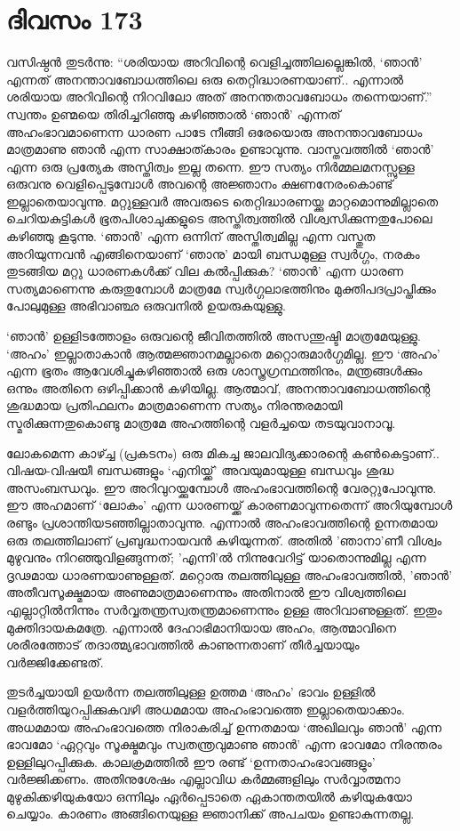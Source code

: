 \section{ദിവസം 173}


വസിഷ്ഠൻ തുടർന്നു: “ശരിയായ അറിവിന്റെ വെളിച്ചത്തിലല്ലെങ്കിൽ, ‘ഞാൻ’ എന്നത് അനന്താവബോധത്തിലെ ഒരു തെറ്റിദ്ധാരണയാണ്‌.. എന്നാൽ ശരിയായ അറിവിന്റെ നിറവിലോ അത് അനന്തതാവബോധം തന്നെയാണ്‌.” സ്വന്തം ഉണ്മയെ തിരിച്ചറിഞ്ഞു കഴിഞ്ഞാൽ ‘ഞാൻ’ എന്നത് അഹംഭാവമാണെന്ന ധാരണ പാടേ നീങ്ങി ഒരേയൊരു അനന്താവബോധം മാത്രമാണു ഞാൻ എന്ന സാക്ഷാത്കാരം ഉണ്ടാവുന്നു. വാസ്തവത്തിൽ ‘ഞാൻ’ എന്ന ഒരു പ്രത്യേക അസ്തിത്വം ഇല്ല തന്നെ. ഈ സത്യം നിർമ്മലമനസ്സുള്ള ഒരുവനു വെളിപ്പെടുമ്പോൾ അവന്റെ അജ്ഞാനം ക്ഷണനേരംകൊണ്ട് ഇല്ലാതെയാവുന്നു. മറ്റുള്ളവർ അവരുടെ തെറ്റിദ്ധാരണയ്ക്കു മാറ്റമൊന്നുമില്ലാതെ ചെറിയകുട്ടികൾ ഭൂതപിശാചുക്കളുടെ അസ്തിത്വത്തിൽ വിശ്വസിക്കുന്നതുപോലെ കഴിഞ്ഞു കൂടുന്നു. ‘ഞാൻ’ എന്ന ഒന്നിന്‌ അസ്തിത്വമില്ല എന്ന വസ്തുത അറിയുന്നവൻ എങ്ങിനെയാണ്‌ ‘ഞാനു’ മായി ബന്ധമുള്ള സ്വർഗ്ഗം, നരകം തുടങ്ങിയ മറ്റു ധാരണകൾക്ക് വില കൽപ്പിക്കുക? ‘ഞാൻ’ എന്ന ധാരണ സത്യമാണെന്നു കരുതുമ്പോൾ മാത്രമേ സ്വർഗ്ഗലാഭത്തിനും മുക്തിപദപ്രാപ്തിക്കും പോലുമുള്ള അഭിവാഞ്ഛ ഒരുവനിൽ ഉയരുകയുള്ളു.

‘ഞാൻ’ ഉള്ളിടത്തോളം ഒരുവന്റെ ജീവിതത്തിൽ അസന്തുഷ്ടി മാത്രമേയുള്ളു. ‘അഹം’ ഇല്ലാതാകാൻ ആത്മജ്ഞാനമല്ലാതെ മറ്റൊരുമാർഗ്ഗമില്ല. ഈ ‘അഹം’ എന്ന ഭൂതം ആവേശിച്ചുകഴിഞ്ഞാൽ ഒരു ശാസ്ത്രഗ്രന്ഥത്തിനും, മന്ത്രങ്ങൾക്കും ഒന്നും അതിനെ ഒഴിപ്പിക്കാൻ കഴിയില്ല. ആത്മാവ്, അനന്താവബോധത്തിന്റെ ശുദ്ധമായ പ്രതിഫലനം മാത്രമാണെന്ന സത്യം നിരന്തരമായി സ്മരിക്കുന്നതുകൊണ്ടു മാത്രമേ അഹത്തിന്റെ വളർച്ചയെ തടയുവാനാവൂ.

ലോകമെന്ന കാഴ്ച്ച (പ്രകടനം) ഒരു മികച്ച ജാലവിദ്യക്കാരന്റെ കൺകെട്ടാണ്‌.. വിഷയ-വിഷയീ ബന്ധങ്ങളും ‘എനിയ്ക്ക്’ അവയുമായുള്ള ബന്ധവും ശുദ്ധ അസംബന്ധവും. ഈ അറിവുറയ്ക്കുമ്പോള്‍ അഹംഭാവത്തിന്റെ വേരറ്റുപോവുന്നു. ഈ അഹമാണ്‌ ‘ലോകം’ എന്ന ധാരണയ്ക്ക് കാരണമാവുന്നതെന്ന് അറിയുമ്പോൾ രണ്ടും പ്രശാന്തിയടഞ്ഞില്ലാതാവുന്നു. എന്നാൽ  അഹംഭാവത്തിന്റെ ഉന്നതമായ ഒരു തലത്തിലാണ്‌ പ്രബുദ്ധനായവൻ കഴിയുന്നത്. അതിൽ 'ഞാനാ'ണീ വിശ്വം മുഴുവനും നിറഞ്ഞുവിളങ്ങുന്നത്; 'എന്നി'ൽ നിന്നുവേറിട്ട് യാതൊന്നുമില്ല എന്ന ദൃഢമായ ധാരണയാണുള്ളത്. മറ്റൊരു തലത്തിലുള്ള അഹംഭാവത്തിൽ, 'ഞാന്‍' അതീവസൂക്ഷ്മമായ അണുമാത്രമാണെന്നും അതിനാൽ ഈ വിശ്വത്തിലെ എല്ലാറ്റിൽനിന്നും സർവ്വതന്ത്രസ്വതന്ത്രമാണെന്നും ഉള്ള അറിവാണുള്ളത്. ഇതും മുക്തിദായകമത്രേ. എന്നാൽ ദേഹാഭിമാനിയായ അഹം, ആത്മാവിനെ ശരീരത്തോട് തദാത്മ്യഭാവത്തിൽ കാണുന്നതാണ്‌ തീർച്ചയായും വർജ്ജിക്കേണ്ടത്.

തുടർച്ചയായി ഉയർന്ന തലത്തിലുള്ള ഉത്തമ ‘അഹം’ ഭാവം ഉള്ളിൽ വളർത്തിയുറപ്പിക്കുകവഴി അധമമായ അഹംഭാവത്തെ ഇല്ലാതെയാക്കാം. അധമമായ അഹംഭാവത്തെ നിരാകരിച്ച് ഉന്നതമായ ‘അഖിലവും ഞാൻ’ എന്ന ഭാവമോ ‘ഏറ്റവും സൂക്ഷ്മമവും സ്വതന്ത്രവുമാണു ഞാൻ’ എന്ന ഭാവമോ നിരന്തരം ഉള്ളിലുറപ്പിക്കുക. കാലക്രമത്തില്‍ ഈ രണ്ട് ‘ഉന്നതാഹംഭാവങ്ങളും’ വർജ്ജിക്കണം. അതിനുശേഷം എല്ലാവിധ കർമ്മങ്ങളിലും സർവ്വാത്മനാ മുഴുകിക്കഴിയുകയോ ഒന്നിലും ഏർപ്പെടാതെ ഏകാന്തതയിൽ കഴിയുകയോ ചെയ്യാം. കാരണം അങ്ങിനെയുള്ള ജ്ഞാനിക്ക് അപചയം ഉണ്ടാകുന്നതല്ല. 
